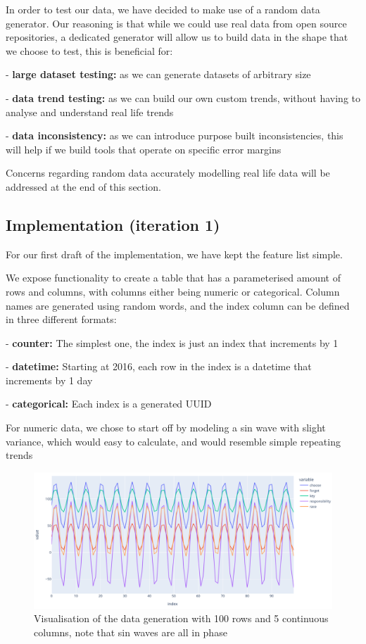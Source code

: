 In order to test our data, we have decided to make use of a random data generator.
Our reasoning is that while we could use real data from open source repositories, a dedicated generator will allow us
to build data in the shape that we choose to test, this is beneficial for:

- \textbf{large dataset testing:} as we can generate datasets of arbitrary size

- \textbf{data trend testing:} as we can build our own custom trends, without having to analyse and understand real life trends

- \textbf{data inconsistency:} as we can introduce purpose built inconsistencies, this will help if we build tools that operate on specific error margins

Concerns regarding random data accurately modelling real life data will be addressed at the end of this section.

\subsection{Implementation (iteration 1)}\label{subsec:implementation-(iteration-1)}
For our first draft of the implementation, we have kept the feature list simple.

We expose functionality to create a table that has a
parameterised amount of rows and columns, with columns either being numeric or categorical.
Column names are generated using random words, and the index column can be defined in three different formats:

- \textbf{counter:} The simplest one, the index is just an index that increments by 1

- \textbf{datetime:} Starting at 2016, each row in the index is a datetime that increments by 1 day

- \textbf{categorical:} Each index is a generated UUID

For numeric data, we chose to start off by modeling a sin wave with slight variance, which would easy to calculate, and
would resemble simple repeating trends

\begin{figure}[H]
    \centering
    \includegraphics[width=12cm]{figures/data_generation/fake_data_gen_continuous_1}
    \caption{Visualisation of the data generation with 100 rows and 5 continuous columns, note that sin waves are all in phase}
    \label{fig:datagen_fig_1}
\end{figure}

